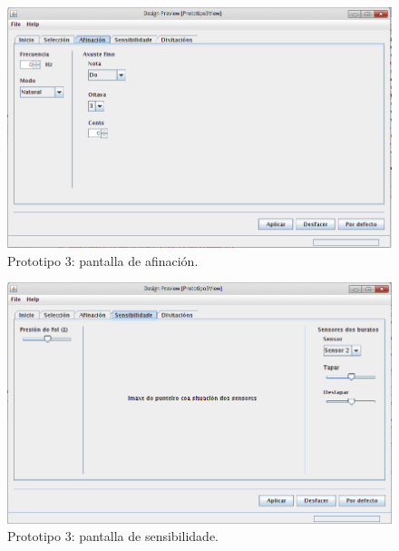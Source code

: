   \begin{figure}[htbp]
   \centering
   \includegraphics[scale=0.6,keepaspectratio=true]{./imagenes/prototipo3-3.png}
   \caption{Prototipo 3: pantalla de afinación.}
   \label{figura:Prototipo3Afinacion}
  \end{figure}

  \begin{figure}[htbp]
   \centering
   \includegraphics[scale=0.6,keepaspectratio=true]{./imagenes/prototipo3-4.png}
   \caption{Prototipo 3: pantalla de sensibilidade.}
   \label{figura:Prototipo3Sensibilidade}
  \end{figure}

